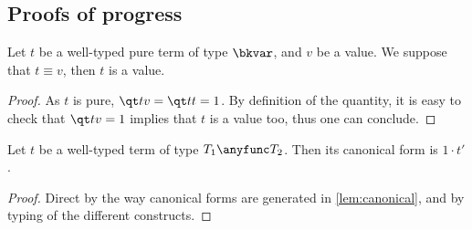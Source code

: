 \subsection{Proofs of progress}

\begin{lemma}\label{lem:equiv-pure}
  Let $t$ be a well-typed pure term of type $\bkvar$, and $v$ be a value.
  We suppose that $t \equiv v$, then $t$ is a value.
\end{lemma}

\begin{proof}
  As $t$ is pure, $ \qt t v = \qt t t = 1$.
  By definition of the quantity, it is easy to check
  that $\qt t v = 1$ implies that $t$ is a value too,
  thus one can conclude. \qedhere
\end{proof}

\begin{lemma}\label{lem:canonical-higher}
  Let $t$ be a well-typed term of type $T_1 \anyfunc T_2$.
  Then its canonical form is $1 \cdot t'$.
\end{lemma}

\begin{proof}
  Direct by the way canonical forms are generated in \autoref{lem:canonical},
  and by typing of the different constructs. \qedhere
\end{proof}

\progress*

